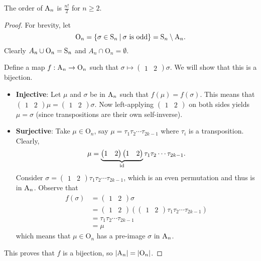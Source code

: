 \begin{proposition}\label{prop-order-of-An}
    The order of $\mathrm{A}_{n}$ is $\frac{n!}{2}$ for $n \geq 2$.
\end{proposition}
\begin{proof}
    For brevity, let
    \[
        \mathrm{O}_n = \left\{\sigma \in \Sn{n} \vert \sigma \text{ is odd}\right\} = \Sn{n} \setminus \An{n}.
    \]
    Clearly $A_n \cup \mathrm{O}_n = \mathrm{S}_{n}$ and $A_n \cap \mathrm{O}_n = \emptyset$.

    Define a map $f: \mathrm{A}_{n} \to \mathrm{O}_n$ such that $\sigma \mapsto \begin{pmatrix}1 & 2\end{pmatrix}\sigma$. We will show that this is a bijection.
    \begin{itemize}
        \item \textbf{Injective}: Let $\mu$ and $\sigma$ be in $\mathrm{A}_{n}$ such that $f(\mu) = f(\sigma)$. This means that $\begin{pmatrix}1 & 2\end{pmatrix}\mu = \begin{pmatrix}1 & 2\end{pmatrix}\sigma$. Now left-applying $\begin{pmatrix}1 & 2\end{pmatrix}$ on both sides yields $\mu = \sigma$ (since transpositions are their own self-inverse).
        
        \item \textbf{Surjective}: Take $\mu \in \mathrm{O}_n$, say $\mu = \tau_1\tau_2\cdots\tau_{2k-1}$ where $\tau_i$ is a transposition. Clearly,
        \[
            \mu = \underbrace{\begin{pmatrix}1 & 2\end{pmatrix}\begin{pmatrix}1 & 2\end{pmatrix}}_{\mathrm{id}}\tau_1\tau_2\cdots\tau_{2k-1}.
        \]
        Consider $\sigma = \begin{pmatrix}1 & 2\end{pmatrix}\tau_1\tau_2\cdots\tau_{2k-1}$, which is an even permutation and thus is in $\mathrm{A}_{n}$. Observe that
        \begin{align*}
            f(\sigma) &= \begin{pmatrix}1 & 2\end{pmatrix}\sigma\\
            &= \begin{pmatrix}1 & 2\end{pmatrix}\left(\begin{pmatrix}1 & 2\end{pmatrix}\tau_1\tau_2\cdots\tau_{2k-1}\right)\\
            &= \tau_1\tau_2\cdots\tau_{2k-1}\\
            &= \mu
        \end{align*}
        which means that $\mu \in \mathrm{O}_n$ has a pre-image $\sigma$ in $\mathrm{A}_{n}$.
    \end{itemize}
    This proves that $f$ is a bijection, so $|\mathrm{A}_{n}| = |\mathrm{O}_n|$.
    

\end{proof}
